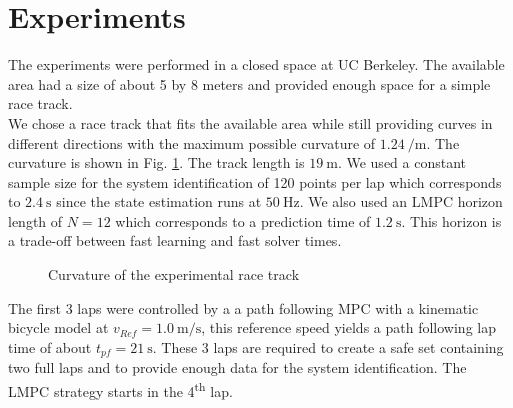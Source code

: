 \section{Experiments}
The experiments were performed in a closed space at UC Berkeley. The available area had a size of about 5 by 8 meters and provided enough space for a simple race track.\\
We chose a race track that fits the available area while still providing curves in different directions with the maximum possible curvature of $\SI{1.24}{\per\meter}$. The curvature is shown in Fig. \ref{fig:exp_curv}. The track length is $\SI{19}{\meter}$.
We used a constant sample size for the system identification of 120 points per lap which corresponds to $\SI{2.4}{\second}$ since the state estimation runs at $\SI{50}{\hertz}$. We also used an LMPC horizon length of $N=12$ which corresponds to a prediction time of $\SI{1.2}{\second}$. This horizon is a trade-off between fast learning and fast solver times.
\begin{figure}[ht]
    \centering
      
    \caption{Curvature of the experimental race track}
    \label{fig:exp_curv}
\end{figure}

The first 3 laps were controlled by a a path following MPC with a kinematic bicycle model at $v_{Ref}=\SI{1.0}{\meter\per\second}$, this reference speed yields a path following lap time of about $t_{pf}=\SI{21}{\second}$. These 3 laps are required to create a safe set containing two full laps and to provide enough data for the system identification. The LMPC strategy starts in the 4\textsuperscript{th} lap.

